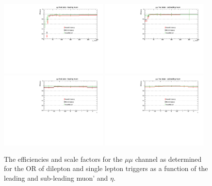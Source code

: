 \begin{figure}[ht]
\centering
\includegraphics[width=0.48\textwidth]{figs/background-estimation/triggerEfficiency/ttbar/muon1_pT_SF.pdf}
\includegraphics[width=0.48\textwidth]{figs/background-estimation/triggerEfficiency/ttbar/muon2_pT_SF.pdf}
\\
\includegraphics[width=0.48\textwidth]{figs/background-estimation/triggerEfficiency/ttbar/muon1_eta_SF.pdf}
\includegraphics[width=0.48\textwidth]{figs/background-estimation/triggerEfficiency/ttbar/muon2_eta_SF.pdf}
\caption{
The efficiencies and scale factors for the $\mu\mu$ channel as determined for the OR of dilepton and single lepton triggers as a function of the leading and sub-leading muon' \pT and $\eta$.
}
\label{fig:App_trigEff_mumu}
\end{figure}

